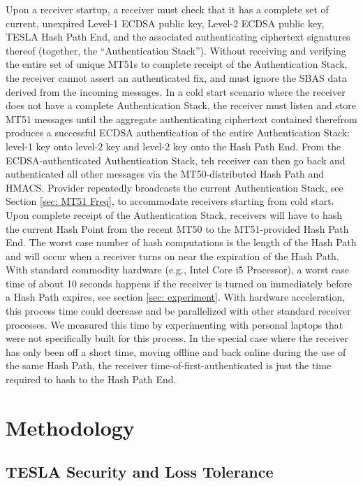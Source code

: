 \documentclass[letterpaper,times]{IONconf/IONconf}
\begin{document}
Upon a receiver startup, a receiver must check that it has a complete set of current, unexpired Level-1 ECDSA public key, Level-2 ECDSA public key, TESLA Hash Path End, and the associated authenticating ciphertext signatures thereof (together, the ``Authentication Stack'').
Without receiving and verifying the entire set of unique MT51s to complete receipt of the Authentication Stack, the receiver cannot assert an authenticated fix, and must ignore the SBAS data derived from the incoming messages.
In a cold start scenario where the receiver does not have a complete Authentication Stack, the receiver must listen and store MT51 messages until the aggregate authenticating ciphertext contained therefrom produces a successful ECDSA authentication of the entire Authentication Stack: level-1 key onto level-2 key and level-2 key onto the Hash Path End.
From the ECDSA-authenticated Authentication Stack, teh receiver can then go back and authenticated all other messages via the MT50-distributed Hash Path and HMACS.
Provider repeatedly broadcasts the current Authentication Stack, see Section \ref{sec: MT51 Freq}, to accommodate receivers starting from cold start.
Upon complete receipt of the Authentication Stack, receivers will have to hash the current Hash Point from the recent MT50 to the MT51-provided Hash Path End.
The worst case number of hash computations is the length of the Hash Path and will occur when a receiver turns on near the expiration of the Hash Path.
With standard commodity hardware (e.g., Intel Core i5 Processor), a worst case time of about 10 seconds happens if the receiver is turned on immediately before a Hash Path expires, see section \ref{sec: experiment}.
With hardware acceleration, this process time could decrease and be parallelized with other standard receiver processes.
We measured this time by experimenting with personal laptops that were not specifically built for this process.
In the special case where the receiver has only been off a short time, moving offline and back online during the use of the same Hash Path, the receiver time-of-first-authenticated is just the time required to hash to the Hash Path End.

\section{Methodology} \label{sec: methodology}

\subsection{TESLA Security and Loss Tolerance}
\end{document}
